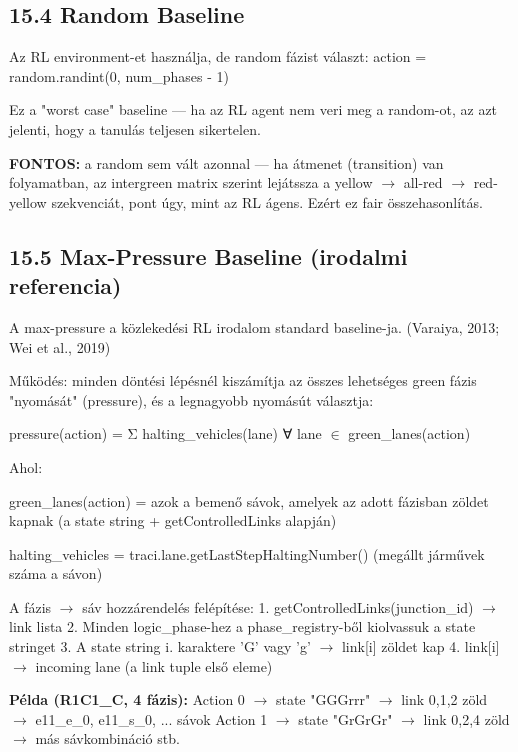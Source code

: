 \documentclass[11pt,a4paper]{article}
\begin{document}
\subsection*{15.4 Random Baseline}
Az RL environment-et használja, de random fázist választ:
action = random.randint(0, num\_phases - 1)

Ez a "worst case" baseline — ha az RL agent nem veri meg a random-ot,
az azt jelenti, hogy a tanulás teljesen sikertelen.

\textbf{FONTOS:} a random sem vált azonnal — ha átmenet (transition) van folyamatban,
az intergreen matrix szerint lejátssza a yellow $\rightarrow$ all-red $\rightarrow$ red-yellow
szekvenciát, pont úgy, mint az RL ágens. Ezért ez fair összehasonlítás.

\subsection*{15.5 Max-Pressure Baseline (irodalmi referencia)}
A max-pressure a közlekedési RL irodalom standard baseline-ja.
(Varaiya, 2013; Wei et al., 2019)

Működés: minden döntési lépésnél kiszámítja az összes lehetséges green
fázis "nyomását" (pressure), és a legnagyobb nyomásút választja:

pressure(action) = Σ halting\_vehicles(lane)
∀ lane $\in$ green\_lanes(action)

Ahol:
\par\noindent\hspace*{1em}\textbullet{} green\_lanes(action) = azok a bemenő sávok, amelyek az adott fázisban
zöldet kapnak (a state string + getControlledLinks alapján)
\par\noindent\hspace*{1em}\textbullet{} halting\_vehicles = traci.lane.getLastStepHaltingNumber()
(megállt járművek száma a sávon)

A fázis $\rightarrow$ sáv hozzárendelés felépítése:
1. getControlledLinks(junction\_id) $\rightarrow$ link lista
2. Minden logic\_phase-hez a phase\_registry-ből kiolvassuk a state stringet
3. A state string i. karaktere 'G' vagy 'g' $\rightarrow$ link[i] zöldet kap
4. link[i] $\rightarrow$ incoming lane (a link tuple első eleme)

\textbf{Példa (R1C1\_C, 4 fázis):}
Action 0 $\rightarrow$ state "GGGrrr" $\rightarrow$ link 0,1,2 zöld $\rightarrow$ e11\_e\_0, e11\_s\_0, ... sávok
Action 1 $\rightarrow$ state "GrGrGr" $\rightarrow$ link 0,2,4 zöld $\rightarrow$ más sávkombináció
stb.
\end{document}
